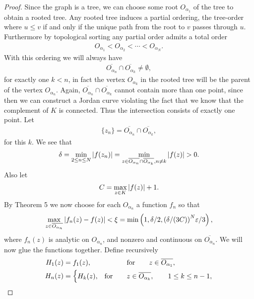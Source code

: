 \documentclass[11pt]{article}
\begin{document}
\begin{proof}
 Since  the graph is a tree, we can choose some root $O_{\alpha_1}$ of the tree to obtain a rooted tree. Any rooted tree induces a partial ordering, the tree-order where $u \leq  v$ if  and only if the unique path from the root to $v$ passes through $u$. Furthermore by topological sorting any partial order admits a total order
\begin{gather*}
         O_{\alpha_1}< O_{\alpha_2}< \cdots <O_{\alpha_N}.
\end{gather*}
With this ordering we will always have 
\begin{gather*}
\overline{O_{\alpha_n}} \cap\overline{O_{\alpha_k}} \neq \emptyset,
\end{gather*}
 for exactly one $k<n$,  in fact the vertex $O_{\alpha_k}$ in the rooted tree will be the parent of the vertex  $O_{\alpha_n}$.  Again, $\overline{O_{\alpha_n}} \cap \overline{O_{\alpha_k}}$ cannot contain more than one point, since then we can construct a Jordan curve violating the fact that we know that  the complement of $K$ is connected. Thus the intersection consists of exactly one point.
Let 
\begin{gather*}
\{z_n\}=\overline{O_{\alpha_n}}  \cap \overline{O_{\alpha_k}},
\end{gather*}
for  this $k$. We see that
\begin{gather} \label{p}
  \delta=\min_{2 \leq n \leq N} \abs{f(z_n)} = \min_{z \in \overline{O_{\alpha_n}} \cap \overline{O_{\alpha_k}}, n \neq k} \abs{f(z)}>0.
\end{gather}
Also let
\begin{gather} \label{pp}
  C=\max_{z \in K} \abs{f(z)}+1.
\end{gather}
By Theorem 5 we now choose for  each $O_{\alpha_n}$ a function $f_n$ so that
\begin{gather} \label{ppp}
  \max_{z \in \overline{O_{\alpha_n}}}\abs{f_n(z)-f(z)}< \xi = \min\left(1,\delta/2,  \p{\delta/(3C)}^N \varepsilon/3\right),
\end{gather}
where $f_n(z)$ is analytic on $O_{\alpha_n}$, and nonzero and continuous on $\overline{O_{\alpha_n}}$. We will now  glue the functions together.
Define recursively
\begin{gather} \label{Hdef} 
 \begin{split}
  H_1(z)&= f_1(z), \qquad  \qquad  \hskip 1pt \, \, \,  \, \, \, \text{for}   \qquad z \in \overline{O_{\alpha_1}},\\
    H_n(z)&= \begin{cases} H_k(z), & \text{for} \qquad   z \in \overline{O_{\alpha_k}}, \qquad   1 \leq k \leq n-1, \\

\end{cases}
\end{split}
\end{gather}
\end{proof}
\end{document}
